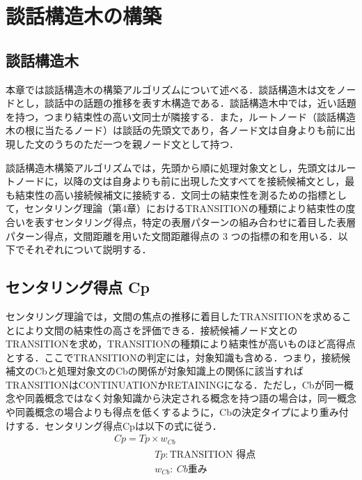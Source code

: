 \documentclass[japanese]{jnlp_1.4}
\begin{document}
\section{談話構造木の構築}
\label{sec:mylabel8}

\subsection{談話構造木}
\label{sec:mylabel9}

本章では談話構造木の構築アルゴリズムについて述べる．談話構造木は文をノードとし，談話中の話題の推移を表す木構造である．談話構造木中では，近い話題を持つ，つまり結束性の高い文同士が隣接する．また，ルートノード（談話構造木の根に当たるノード）は談話の先頭文であり，各ノード文は自身よりも前に出現した文のうちのただ一つを親ノード文として持つ．

談話構造木構築アルゴリズムでは，先頭から順に処理対象文とし，先頭文はルートノードに，以降の文は自身よりも前に出現した文すべてを接続候補文とし，最も結束性の高い接続候補文に接続する．文同士の結束性を測るための指標として，センタリング理論（第4章）におけるTRANSITIONの種類により結束性の度合いを表すセンタリング得点，特定の表層パターンの組み合わせに着目した表層パターン得点，文間距離を用いた文間距離得点の 3 つの指標の和を用いる．以下でそれぞれについて説明する．


\subsection{センタリング得点 Cp}
\label{sec:mylabel10}

センタリング理論では，文間の焦点の推移に着目したTRANSITIONを求めることにより文間の結束性の高さを評価できる．接続候補ノード文とのTRANSITIONを求め，TRANSITIONの種類により結束性が高いものほど高得点とする．ここでTRANSITIONの判定には，対象知識も含める．つまり，接続候補文のCbと処理対象文のCbの関係が対象知識上の関係に該当すればTRANSITIONはCONTINUATIONかRETAININGになる．ただし，Cbが同一概念や同義概念ではなく対象知識から決定される概念を持つ語の場合は，同一概念や同義概念の場合よりも得点を低くするように，Cbの決定タイプにより重み付けする．センタリング得点Cpは以下の式に従う．
\begin{align}
 & Cp = Tp\times w_{Cb} \\ 
 & \hspace{50pt} Tp: \text{TRANSITION 得点} \nonumber\\ 
 & \hspace{50pt} w_{Cb}:\ Cb 重み \nonumber
\end{align}
\end{document}
